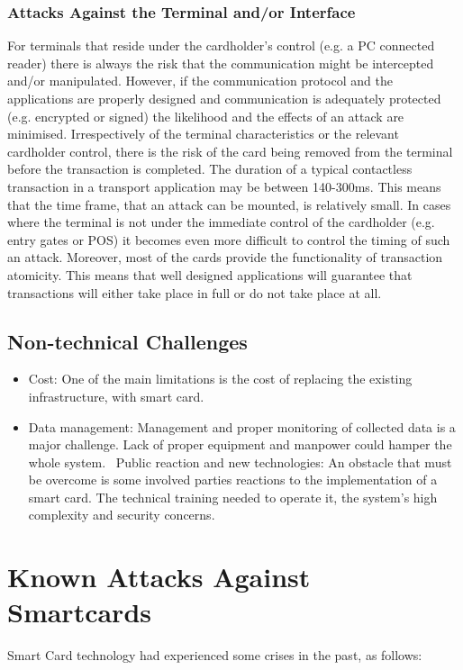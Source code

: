\documentclass[12pt]{article}
\begin{document}
\subsubsection{Attacks Against the Terminal and/or
Interface}
For terminals that reside under the cardholder’s
control (e.g. a PC connected reader) there is always the
risk that the communication might be intercepted
and/or manipulated. However, if the communication
protocol and the applications are properly designed and
communication is adequately protected (e.g. encrypted
or signed) the likelihood and the effects of an attack
are minimised.\newline
Irrespectively of the terminal characteristics or the
relevant cardholder control, there is the risk of the card
being removed from the terminal before the transaction
is completed. The duration of a typical contactless
transaction in a transport application may be between
140-300ms. This means that the time frame, that an
attack can be mounted, is relatively small. In cases
where the terminal is not under the immediate control
of the cardholder (e.g. entry gates or POS) it becomes
even more difficult to control the timing of such an
attack. Moreover, most of the cards provide the
functionality of transaction atomicity. This means
that well designed applications will guarantee that
transactions will either take place in full or do not take
place at all.

\subsection{Non-technical Challenges}
\begin{itemize}
\item Cost: One of the main limitations is the cost of replacing the
existing infrastructure, with smart card. 
\item Data management: Management and proper monitoring of collected data is a major challenge. Lack of proper equipment and manpower could hamper the whole system.
\ Public reaction and new technologies: An obstacle that must be overcome is some involved
parties reactions to the implementation of a smart card.
The technical training needed to operate it, the system's high
complexity and security concerns.

\end{itemize}

\section{Known Attacks Against Smartcards}
Smart Card technology had experienced some crises in the past, as follows:
\end{document}
